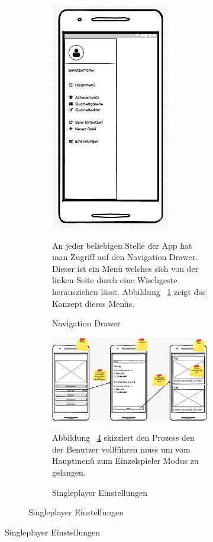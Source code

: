 \documentclass{scrartcl}
\begin{document}
\begin{figure}[!ht]
\begin{figure}[!ht]
\begin{figure}[!ht]
\begin{center}
	\includegraphics[scale=0.75]{img/mockup_drawer.png}
	\caption{Navigation Drawer}
	\label{drawer}
\end{center}
An jeder beliebigen Stelle der App hat man Zugriff auf den Navigation Drawer. Dieser ist ein Menü welches sich von der linken Seite durch eine Wischgeste herausziehen lässt. Abbildung ~\ref{drawer} zeigt das Konzept dieses Menüs.
\end{figure}

\begin{figure}[!ht]
\begin{center}
	\includegraphics[scale=0.7]{img/mockup_game_process_1.png}
	\caption{Singleplayer Einstellungen}
	\label{singleplayer1}
\end{center}
Abbildung ~\ref{singleplayer1} skizziert den Prozess den der Benutzer vollführen muss um vom Hauptmenü zum Einzelspieler Modus zu gelangen.
\end{figure}


\end{figure}
\end{figure}
\end{document}
